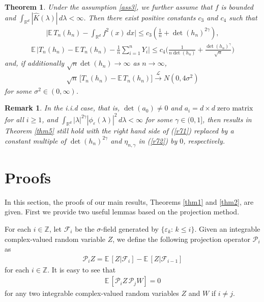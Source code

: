 \documentclass[11pt]{article}
\newtheorem {theorem}{Theorem}[section]
\newtheorem{remark}{Remark}[section]
\def\R{{\mathbb R}}
\def\E{{{\mathbb E}\,}}
\def\Z{{\mathbb Z}}
\begin{document}
\begin{theorem} \label{thm6} 
Under the assumption \ref{ass3}, we further assume that $f$ is bounded and $\int_{\R^d} |\widehat{K}(\lambda)|\, d\lambda<\infty$. Then there exist positive constants $c_3$ and $c_4$ such that
\begin{align} \label{r74}
\Big|\E T_n(h_n)-\int_{\R^d} f^2(x)\, dx \Big|\leq c_3\left(\frac{1}{n}+\det(h_n)^{2\gamma}\right),
\end{align}
\begin{align}  \label{r75}
\E\Big|T_n(h_n)-\E T_n(h_n)-\frac{1}{n}\sum^n_{i=1}Y_i\Big| \leq c_4 \Big(\frac{1}{n\det(h_n)}+\frac{\det(h_n)^{\gamma}}{\sqrt{n}}\Big)
\end{align}
and, if additionally $\sqrt{n}\det(h_n)\to \infty$ as $n\to\infty$,
\begin{align} \label{r76}
\sqrt{n}\, \Big[T_n(h_n)-\E T_n(h_n)\Big]\overset{\mathcal{L}}{\longrightarrow} N(0,4\sigma^2)
\end{align}
for some $\sigma^2\in(0,\infty)$.

\end{theorem}

\bigskip

\begin{remark}
In the i.i.d case, that is, $\det(a_0)\neq 0$ and $a_i=d\times d\; \text{zero matrix}$ for all $i\geq 1$, and  $\int_{\R^d}|\lambda|^{2\gamma} |\phi_{\varepsilon}(\lambda)|^2\, d\lambda<\infty$ for some $\gamma\in(0,1]$, then results in Theorem \ref{thm5} still hold with the right hand side of (\ref{r71}) replaced by a constant multiple of $\det(h_n)^{2\gamma}$ and $\eta_{n,\gamma}$ in (\ref{r72}) by $0$, respectively.
\end{remark}

\bigskip


\section{Proofs}\label{proof}

In this section, the proofs of our main results, Theorems \ref{thm1} and \ref{thm2}, are given. First we provide two useful lemmas based on the projection method. 

For each $i\in\Z$, let  $\mathcal{F}_i$ be the $\sigma$-field generated by $\{\varepsilon_k:\, k\le i\}$. Given an integrable complex-valued random variable $Z$, we define the following projection operator $\mathcal{P}_i$ as 
\begin{align} \label{proj}
\mathcal{P}_i Z=\E[Z|\mathcal{F}_i]-\E[Z|\mathcal{F}_{i-1}]
\end{align}
for each $i\in\Z$. It is easy to see that 
\begin{align}
\E[\mathcal{P}_i Z\, \mathcal{P}_j W]=0\label{projprod}
\end{align} 
for any two integrable complex-valued random variables $Z$ and $W$ if $i\neq j$.  
\end{document}
